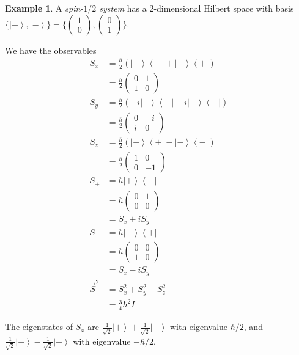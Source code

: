 \documentclass{book}
\theoremstyle{definition}
\newtheorem{ex}[prop]{Example}
\newcommand{\bra}[1]{\ensuremath{\left\langle {#1} \right|}}
\newcommand{\ket}[1]{\ensuremath{\left| {#1} \right\rangle}}
\begin{document}
\begin{ex}
A \emph{spin-$1/2$ system} has a 2-dimensional Hilbert space with basis $\{ \ket{+}, \ket{-} \} = \{ \left( \begin{array}{c} 1 \\ 0 \end{array} \right), \left( \begin{array}{c} 0 \\ 1 \end{array} \right) \}$.

We have the observables
\begin{align*}
S_x & = \frac{\hbar}{2} (\ket{+} \bra{-} + \ket{-} \bra{+}) \\
& = \frac{\hbar}{2} \left( \begin{array}{cc}
0 & 1 \\ 1 & 0
\end{array} \right) \\
S_y & = \frac{\hbar}{2} (-i \ket{+} \bra{-} + i \ket{-} \bra{+}) \\
& = \frac{\hbar}{2} \left( \begin{array}{cc}
0 & -i \\
i & 0
\end{array} \right) \\
S_z & = \frac{\hbar}{2} (\ket{+} \bra{+} - \ket{-} \bra{-}) \\
& = \frac{\hbar}{2} \left( \begin{array}{cc} 1 & 0 \\ 0 & -1 \end{array} \right) \\
S_+ & = \hbar \ket{+} \bra{-} \\
& = \hbar \left( \begin{array}{cc}
0 & 1 \\ 0 & 0
\end{array} \right) \\
& = S_x + i S_y \\
S_- & = \hbar \ket{-} \bra{+} \\
& = \hbar \left( \begin{array}{cc}
0 & 0 \\ 1 & 0 \end{array} \right) \\
& = S_x - i S_y \\
\vec{S}^2 & = S_x^2 + S_y^2 + S_z^2 \\
& = \frac{3}{4} \hbar^2 I
\end{align*}

The eigenstates of $S_x$ are $\frac{1}{\sqrt{2}} \ket{+} + \frac{1}{\sqrt{2}} \ket{-}$ with eigenvalue $\hbar / 2$, and $\frac{1}{\sqrt{2}} \ket{+} - \frac{1}{\sqrt{2}} \ket{-}$ with eigenvalue $- \hbar / 2$.


\end{ex}
\end{document}
